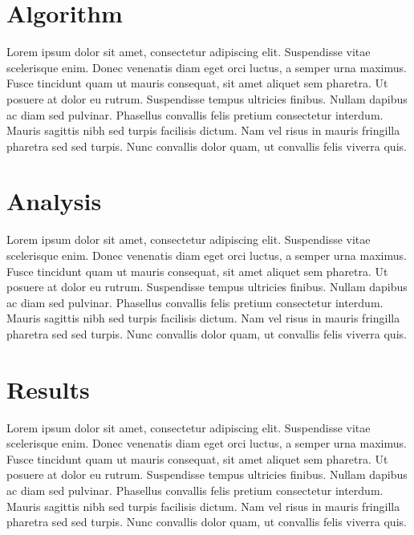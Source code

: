 \documentclass{sig-alternate}
\begin{document}

\section{Algorithm}
Lorem ipsum dolor sit amet, consectetur adipiscing elit. Suspendisse vitae scelerisque enim. Donec venenatis diam eget orci luctus, a semper urna maximus. Fusce tincidunt quam ut mauris consequat, sit amet aliquet sem pharetra. Ut posuere at dolor eu rutrum. Suspendisse tempus ultricies finibus. Nullam dapibus ac diam sed pulvinar. Phasellus convallis felis pretium consectetur interdum. Mauris sagittis nibh sed turpis facilisis dictum. Nam vel risus in mauris fringilla pharetra sed sed turpis. Nunc convallis dolor quam, ut convallis felis viverra quis.


\section{Analysis}
Lorem ipsum dolor sit amet, consectetur adipiscing elit. Suspendisse vitae scelerisque enim. Donec venenatis diam eget orci luctus, a semper urna maximus. Fusce tincidunt quam ut mauris consequat, sit amet aliquet sem pharetra. Ut posuere at dolor eu rutrum. Suspendisse tempus ultricies finibus. Nullam dapibus ac diam sed pulvinar. Phasellus convallis felis pretium consectetur interdum. Mauris sagittis nibh sed turpis facilisis dictum. Nam vel risus in mauris fringilla pharetra sed sed turpis. Nunc convallis dolor quam, ut convallis felis viverra quis.


\section{Results}
Lorem ipsum dolor sit amet, consectetur adipiscing elit. Suspendisse vitae scelerisque enim. Donec venenatis diam eget orci luctus, a semper urna maximus. Fusce tincidunt quam ut mauris consequat, sit amet aliquet sem pharetra. Ut posuere at dolor eu rutrum. Suspendisse tempus ultricies finibus. Nullam dapibus ac diam sed pulvinar. Phasellus convallis felis pretium consectetur interdum. Mauris sagittis nibh sed turpis facilisis dictum. Nam vel risus in mauris fringilla pharetra sed sed turpis. Nunc convallis dolor quam, ut convallis felis viverra quis.
\end{document}

